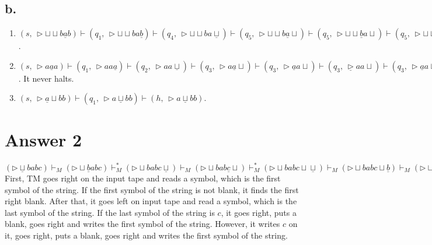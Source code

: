 \documentclass[12pt]{article}
\begin{document}
\subsection*{b.}
\begin{enumerate}
\item[i)] $(s,\,\triangleright\sqcup\sqcup b\underline{a}b) \vdash (q_1,\,\triangleright\sqcup\sqcup ba\underline{b}) \vdash (q_4,\,\triangleright\sqcup\sqcup ba\underline{\sqcup}) \vdash (q_5,\,\triangleright\sqcup\sqcup b\underline{a}\sqcup) \vdash (q_5,\,\triangleright\sqcup\sqcup \underline{b}a\sqcup) \vdash (q_5,\,\triangleright\sqcup \underline{\sqcup}ba\sqcup) \vdash (h,\,\triangleright\sqcup \underline{b}ba\sqcup)$.

\item[ii)] $(s,\,\triangleright a\underline{a}a) \vdash (q_1,\,\triangleright aa\underline{a}) \vdash (q_2,\,\triangleright aa\underline{\sqcup}) \vdash (q_3,\,\triangleright a\underline{a}\sqcup) \vdash (q_3,\,\triangleright \underline{a}a\sqcup) \vdash (q_3,\, \underline{\triangleright}aa\sqcup) \vdash (q_3,\,\triangleright \underline{a}a\sqcup) \vdash (q_3,\, \underline{\triangleright}aa\sqcup)$. It never halts.

\item[iii)] $(s,\,\triangleright\underline{a}\sqcup b b) \vdash (q_1,\,\triangleright a\underline{\sqcup} b b) \vdash (h,\,\triangleright a\underline{\sqcup} b b)$.
\end{enumerate}

\section*{Answer 2}
$(\triangleright \underline{\sqcup} babc) \vdash_M (\triangleright \sqcup \underline{b} abc) \vdash^*_M (\triangleright \sqcup babc \underline{\sqcup}) \vdash_M (\triangleright \sqcup bab \underline{c}\sqcup) \vdash^*_M (\triangleright \sqcup babc \sqcup \underline{\sqcup}) \vdash_M (\triangleright \sqcup babc \sqcup \underline{b}) \vdash_M (\triangleright \sqcup babc \sqcup \underline{c}) \vdash^*_M (\triangleright \sqcup babc \sqcup c \sqcup \underline{\sqcup}) \vdash_M (\triangleright \sqcup babc \sqcup c \sqcup \underline{b})$ \\

First, TM goes right on the input tape and reads a symbol, which is the first symbol of the string. If the first symbol of the string is not blank, it finds the first right blank. After that, it goes left on input tape and read a symbol, which is the last symbol of the string. If the last symbol of the string is $c$, it goes right, puts a blank, goes right and writes the first symbol of the string. However, it writes $c$ on it, goes right, puts a blank, goes right and writes the first symbol of the string.\\
\end{document}
